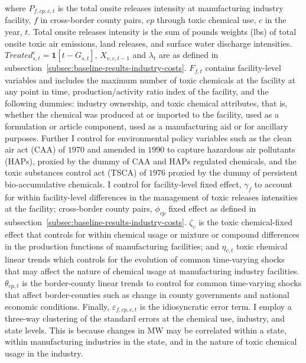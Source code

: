 \documentclass{C:/Users/david/OneDrive/Documents/ULMS/PhD/Thesis/chapter3/src/climate_change/latex/Economic_Journal/OUP-EJ}
\begin{document}
    where $P_{f,cp,c,t}$ is the total onsite releases intensity at manufacturing industry facility, $f$ in cross-border county pairs, $cp$ through toxic chemical use, $c$ in the year, $t$. Total onsite releases intensity is the sum of pounds weights (lbs) of total onsite toxic air emissions, land releases, and surface water discharge intensities. $Treated_{s,t}^e = \textbf{1}[t - G_{s,t}]$, $X_{v,c,t-1}$ and $\lambda_{t}$ are as defined in subsection~\ref{subsec:baseline-results-industry-costs}. $F_{f,t}$ contains facility-level variables and includes the maximum number of toxic chemicals at the facility at any point in time, production/activity ratio index of the facility, and the following dummies: industry ownership, and toxic chemical attributes, that is, whether the chemical was produced at or imported to the facility, used as a formulation or article component, used as a manufacturing aid or for ancillary purposes. Further I control for environmental policy variables such as the clean air act (CAA) of $1970$ and amended in $1990$ to capture hazardous air pollutants (HAPs), proxied by the dummy of CAA and HAPs regulated chemicals, and the toxic substances control act (TSCA) of $1976$ proxied by the dummy of persistent bio-accumulative chemicals. I control for facility-level fixed effect, $\gamma_{f}$ to account for within facility-level differences in the management of toxic releases intensities at the facility; cross-border county pairs, $\phi_{cp}$ fixed effect as defined in subsection~\ref{subsec:baseline-results-industry-costs}. $\zeta_{c}$ is the toxic chemical-fixed effect that controls for within chemical usage or mixture or compound differences in the production functions of manufacturing facilities; and $\eta_{c,t}$ toxic chemical linear trends which controls for the evolution of common time-varying shocks that may affect the nature of chemical usage at manufacturing industry facilities. $\theta_{cp,t}$ is the border-county linear trends to control for common time-varying shocks that affect border-counties such as change in county governments and national economic conditions. Finally, $\varepsilon_{f,cp,c,t}$ is the idiosyncratic error term. I employ a three-way clustering of the standard errors at the chemical use, industry, and state levels. This is because changes in MW may be correlated within a state, within manufacturing industries in the state, and in the nature of toxic chemical usage in the industry.
    
\end{document}
